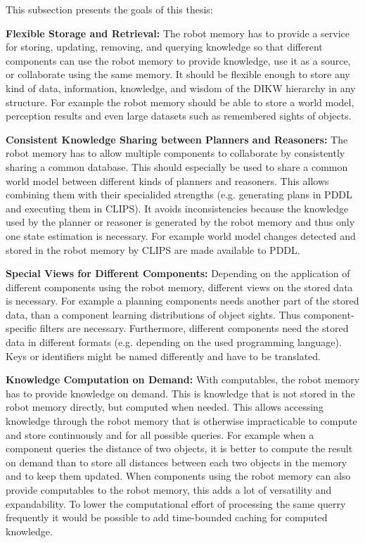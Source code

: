 \documentclass[a4paper,11pt]{article}
\begin{document}
This subsection presents the goals of this thesis:

\smallskip
\textbf{Flexible Storage and Retrieval:} The robot memory has to
provide a service for storing, updating, removing, and querying knowledge
so that different components can use the robot memory to provide knowledge,
use it as a source, or collaborate using the same memory. It should be
flexible enough to store any kind of data, information, knowledge, and
wisdom of the DIKW hierarchy in any structure. For example the robot
memory should be able to store a world model, perception results and
even large datasets such as remembered sights of objects.

\smallskip
\textbf{Consistent Knowledge Sharing between Planners and Reasoners:}
The robot memory has to allow multiple components to collaborate by
consistently sharing a common database. This should especially be used
to share a common world model between different kinds of planners and
reasoners.  This allows combining them with their specialided
strengths (e.g. generating plans in PDDL and executing them in CLIPS).
It avoids inconsistencies because the knowledge used by the planner or
reasoner is generated by the robot memory and thus only one state
estimation is necessary. For example world model changes detected and
stored in the robot memory by CLIPS are made available to PDDL.

\smallskip
\textbf{Special Views for Different Components:} Depending on the
application of different components using the robot memory, different
views on the stored data is necessary. For example a planning
components needs another part of the stored data, than a component
learning distributions of object sights. Thus component-specific
filters are necessary. Furthermore, different components need the
stored data in different formats (e.g. depending on the used
programming language). Keys or identifiers might be named differently
and have to be translated.

\smallskip
\textbf{Knowledge Computation on Demand:} With computables, the robot
memory has to provide knowledge on demand. This is knowledge that is
not stored in the robot memory directly, but computed when
needed. This allows accessing knowledge through the robot memory that
is otherwise impracticable to compute and store continuously and for
all possible queries. For example when a component queries the
distance of two objects, it is better to compute the result on demand
than to store all distances between each two objects in the memory and
to keep them updated. When components using the robot memory can also
provide computables to the robot memory, this adds a lot of
versatility and expandability. To lower the computational effort of
processing the same querry frequently it would be possible to add
time-bounded caching for computed knowledge.
\end{document}
